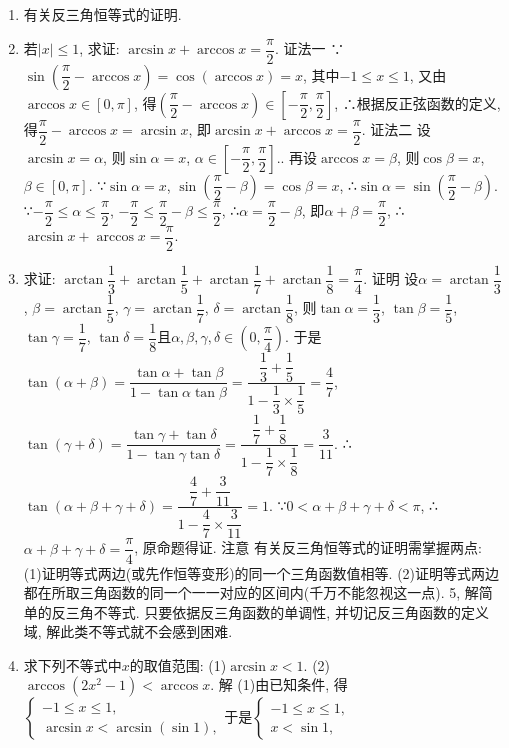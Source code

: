 \documentclass[10pt,a4paper]{article}
\begin{document}
\begin{enumerate}[1.]
\item 有关反三角恒等式的证明.
\item 若$|x|\le 1$, 求证: $\arcsin x+\arccos x=\dfrac{\pi }2$.
证法一  ∵$\sin (\dfrac{\pi }2-\arccos x)=\cos (\arccos x)=x$, 其中$-1\le x\le 1$,
又由$\arccos x\in [0,\pi]$, 得$(\dfrac{\pi }2-\arccos x)\in [-\dfrac{\pi }2,\dfrac{\pi }2]$,
∴根据反正弦函数的定义, 得$\dfrac{\pi }2-\arccos x=\arcsin x$, 即$\arcsin x+\arccos x=\dfrac{\pi }2$.
证法二  设$\arcsin x=\alpha$, 则$\sin \alpha =x$, $\alpha \in [-\dfrac{\pi }2,\dfrac{\pi }2]$..
再设$\arccos x=\beta$, 则$\cos \beta =x$, $\beta \in [0,\pi]$.
∵$\sin \alpha =x$, $\sin (\dfrac{\pi }2-\beta)=\cos \beta =x$, ∴$\sin \alpha =\sin (\dfrac{\pi }2-\beta)$.
∵$-\dfrac{\pi }2\le \alpha \le \dfrac{\pi }2$, $-\dfrac{\pi }2\le \dfrac{\pi }2-\beta \le \dfrac{\pi }2$, ∴$\alpha =\dfrac{\pi }2-\beta$,
即$\alpha +\beta =\dfrac{\pi }2$, ∴$\arcsin x+\arccos x=\dfrac{\pi }2$.
\item 求证: $\arctan \dfrac 13+\arctan \dfrac 15+\arctan \dfrac 17+\arctan \dfrac 18=\dfrac{\pi }4$.
证明  设$\alpha =\arctan \dfrac 13$, $\beta =\arctan \dfrac 15$, $\gamma =\arctan \dfrac 17$, $\delta =\arctan \dfrac 18$,
则$\tan \alpha =\dfrac 13$, $\tan \beta =\dfrac 15$, $\tan \gamma =\dfrac 17$, $\tan \delta =\dfrac 18$且$\alpha ,\beta ,\gamma ,\delta \in (0,\dfrac{\pi }4)$.
于是$\tan (\alpha +\beta)=\dfrac{\tan \alpha +\tan \beta }{1-\tan \alpha \tan \beta }=\dfrac{\dfrac 13+\dfrac 15}{1-\dfrac 13\times \dfrac 15}=\dfrac 47$,
$\tan (\gamma +\delta)=\dfrac{\tan \gamma +\tan \delta }{1-\tan \gamma \tan \delta }=\dfrac{\dfrac 17+\dfrac 18}{1-\dfrac 17\times \dfrac 18}=\dfrac 3{11}$.
∴$\tan (\alpha +\beta +\gamma +\delta)=\dfrac{\dfrac 47+\dfrac 3{11}}{1-\dfrac 47\times \dfrac 3{11}}=1$.
∵$0<\alpha +\beta +\gamma +\delta <\pi$, ∴$\alpha +\beta +\gamma +\delta =\dfrac{\pi }4$, 原命题得证.
注意  有关反三角恒等式的证明需掌握两点:
(1)证明等式两边(或先作恒等变形)的同一个三角函数值相等.
(2)证明等式两边都在所取三角函数的同一个一一对应的区间内(千万不能忽视这一点).
5, 解简单的反三角不等式.
只要依据反三角函数的单调性, 并切记反三角函数的定义域, 解此类不等式就不会感到困难.
\item 求下列不等式中$x$的取值范围:
(1)$\arcsin x<1$.						(2)$\arccos (2x^2-1)<\arccos x$.
解  (1)由已知条件, 得$\begin{cases} -1\le x\le 1, \\ \arcsin x<\arcsin (\sin 1), \end{cases}$于是$\begin{cases} -1\le x\le 1, \\ x<\sin 1, \end{cases}$

\end{enumerate}
\end{document}
